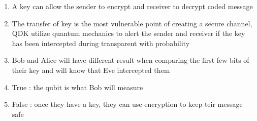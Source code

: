 \documentclass[a4paper]{article}
\begin{document}
    \begin{enumerate}[1.]
        \item A key can allow the sender to encrypt and receiver to decrypt coded message
        \item The transfer of key is the most vulnerable point of creating a secure channel, QDK utilize quantum mechanics to alert the sender and receiver if the key has been intercepted during transparent with probability
        \item Bob and Alice will have different result when comparing the first few bits of their key and will know that Eve intercepted them
        \item True : the qubit is what Bob will measure
        \item False : once they have a key, they can use encryption to keep teir message safe
    \end{enumerate}
\end{document}
